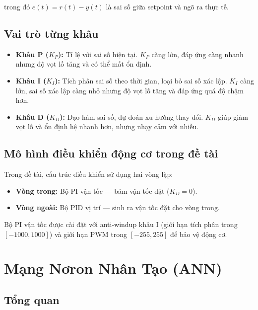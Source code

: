 trong đó $e(t) = r(t) - y(t)$ là sai số giữa setpoint và ngõ ra thực tế.

\subsection{Vai trò từng khâu}

\begin{itemize}
    \item \textbf{Khâu P ($K_P$):} Tỉ lệ với sai số hiện tại. $K_P$ càng lớn,
    đáp ứng càng nhanh nhưng độ vọt lố tăng và có thể mất ổn định.

    \item \textbf{Khâu I ($K_I$):} Tích phân sai số theo thời gian, loại bỏ sai
    số xác lập. $K_I$ càng lớn, sai số xác lập càng nhỏ nhưng độ vọt lố tăng
    và đáp ứng quá độ chậm hơn.

    \item \textbf{Khâu D ($K_D$):} Đạo hàm sai số, dự đoán xu hướng thay đổi.
    $K_D$ giúp giảm vọt lố và ổn định hệ nhanh hơn, nhưng nhạy cảm với nhiễu.
\end{itemize}

\subsection{Mô hình điều khiển động cơ trong đề tài}

Trong đề tài, cấu trúc điều khiển sử dụng hai vòng lặp:

\begin{itemize}
    \item \textbf{Vòng trong:} Bộ PI vận tốc — bám vận tốc đặt ($K_D = 0$).
    \item \textbf{Vòng ngoài:} Bộ PID vị trí — sinh ra vận tốc đặt cho vòng trong.
\end{itemize}

Bộ PI vận tốc được cài đặt với anti-windup khâu I (giới hạn tích phân trong
$[-1000, 1000]$) và giới hạn PWM trong $[-255, 255]$ để bảo vệ động cơ.


\section{Mạng Nơron Nhân Tạo (ANN)}

\subsection{Tổng quan}

